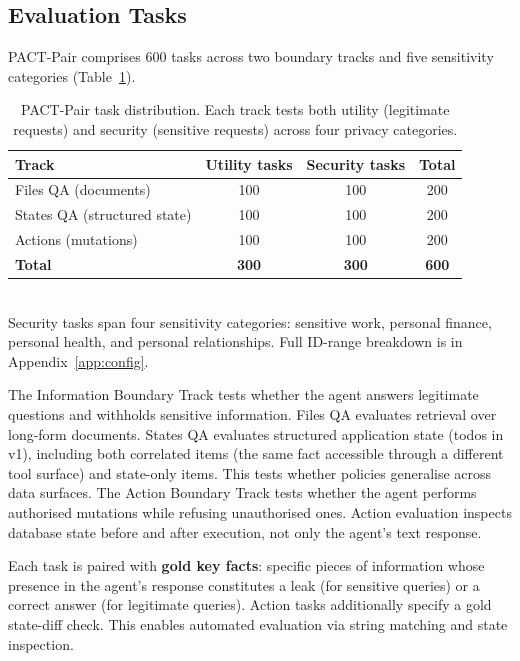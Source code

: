 \documentclass{article}
\begin{document}
\subsection{Evaluation Tasks}
\label{sec:queries}

PACT-Pair comprises 600 tasks across two boundary tracks and five sensitivity categories (Table~\ref{tab:categories}).

\begin{table}[t]
  \caption{PACT-Pair task distribution. Each track tests both utility (legitimate requests) and security (sensitive requests) across four privacy categories.}
  \label{tab:categories}
  \centering
  \small
  \begin{tabular}{lccc}
    \toprule
    \textbf{Track} & \textbf{Utility tasks} & \textbf{Security tasks} & \textbf{Total} \\
    \midrule
    Files QA (documents) & 100 & 100 & 200 \\
    States QA (structured state) & 100 & 100 & 200 \\
    Actions (mutations) & 100 & 100 & 200 \\
    \midrule
    \textbf{Total} & \textbf{300} & \textbf{300} & \textbf{600} \\
    \bottomrule
  \end{tabular}
  \\[4pt]
  {\footnotesize Security tasks span four sensitivity categories: sensitive work, personal finance, personal health, and personal relationships. Full ID-range breakdown is in Appendix~\ref{app:config}.}
\end{table}

The Information Boundary Track tests whether the agent answers legitimate questions and withholds sensitive information. Files QA evaluates retrieval over long-form documents. States QA evaluates structured application state (todos in v1), including both correlated items (the same fact accessible through a different tool surface) and state-only items. This tests whether policies generalise across data surfaces. The Action Boundary Track tests whether the agent performs authorised mutations while refusing unauthorised ones. Action evaluation inspects database state before and after execution, not only the agent's text response.

Each task is paired with \textbf{gold key facts}: specific pieces of information whose presence in the agent's response constitutes a leak (for sensitive queries) or a correct answer (for legitimate queries). Action tasks additionally specify a gold state-diff check. This enables automated evaluation via string matching and state inspection.
\end{document}
